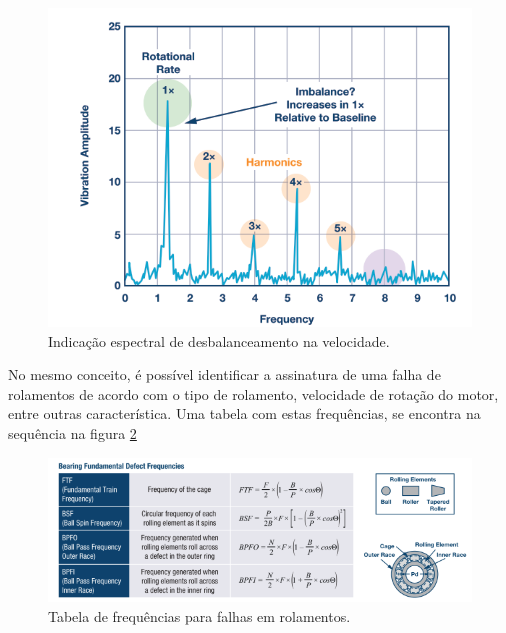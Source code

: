 \begin{figure}[H]
    \caption{Indicação espectral de desbalanceamento na velocidade.}
    \begin{center}
        \includegraphics[scale=.5]{referencial/img/imbalance_analog_p2.png}
    \end{center}
    \label{fig:imbalance_analog_p2}
\end{figure}

No mesmo conceito, é possível identificar a assinatura de uma falha de rolamentos de acordo com o tipo de rolamento, velocidade de rotação
do motor, entre outras característica. Uma tabela com estas frequências, se encontra na sequência na figura \ref{fig:bearing_table_analog_p3}


\begin{figure}[H]
    \caption{Tabela de frequências para falhas em rolamentos.}
    \begin{center}
        \includegraphics[scale=.7]{referencial/img/bearing_table_analog_p3.png}
    \end{center}
    \label{fig:bearing_table_analog_p3}
\end{figure}

